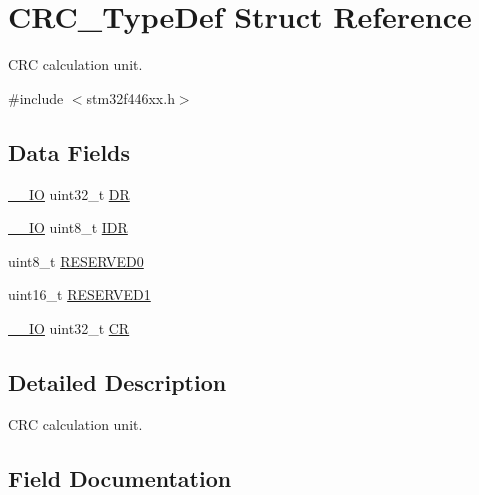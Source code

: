 \hypertarget{struct_c_r_c___type_def}{}\section{C\+R\+C\+\_\+\+Type\+Def Struct Reference}
\label{struct_c_r_c___type_def}


C\+RC calculation unit.  




{\ttfamily \#include $<$stm32f446xx.\+h$>$}

\subsection*{Data Fields}
\begin{DoxyCompactItemize}
\item 
\mbox{\hyperlink{core__sc300_8h_aec43007d9998a0a0e01faede4133d6be}{\+\_\+\+\_\+\+IO}} uint32\+\_\+t \mbox{\hyperlink{struct_c_r_c___type_def_a3df0d8dfcd1ec958659ffe21eb64fa94}{DR}}
\item 
\mbox{\hyperlink{core__sc300_8h_aec43007d9998a0a0e01faede4133d6be}{\+\_\+\+\_\+\+IO}} uint8\+\_\+t \mbox{\hyperlink{struct_c_r_c___type_def_a601d7b0ba761c987db359b2d7173b7e0}{I\+DR}}
\item 
uint8\+\_\+t \mbox{\hyperlink{struct_c_r_c___type_def_aa7d2bd5481ee985778c410a7e5826b71}{R\+E\+S\+E\+R\+V\+E\+D0}}
\item 
uint16\+\_\+t \mbox{\hyperlink{struct_c_r_c___type_def_a8249a3955aace28d92109b391311eb30}{R\+E\+S\+E\+R\+V\+E\+D1}}
\item 
\mbox{\hyperlink{core__sc300_8h_aec43007d9998a0a0e01faede4133d6be}{\+\_\+\+\_\+\+IO}} uint32\+\_\+t \mbox{\hyperlink{struct_c_r_c___type_def_ab40c89c59391aaa9d9a8ec011dd0907a}{CR}}
\end{DoxyCompactItemize}


\subsection{Detailed Description}
C\+RC calculation unit. 

\subsection{Field Documentation}
\mbox{\label{struct_c_r_c___type_def_ab40c89c59391aaa9d9a8ec011dd0907a}} 
